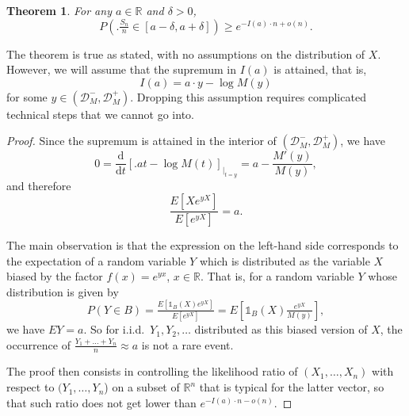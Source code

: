 \documentclass[12pt]{article}
\newtheorem{theorem}[equation]{Theorem}
\theoremstyle{definition}
\newcommand{\dd}{\mathrm{d}}
\newcommand{\D}{\mathcal{D}}
\newcommand{\E}{\mathbb{E}}
\newcommand{\I}{\mathds{1}}
\renewcommand{\P}{\mathbb{P}}
\newcommand{\R}{\mathbb{R}}
\renewcommand{\ge}{\geqslant}
\renewcommand{\t}{t}
\newcommand{\y}{y}
\renewcommand{\E}{E}
\renewcommand{\P}{P}
\begin{document}
\begin{theorem}
\label{thm:lowercramer}
For any $a\in\R$ and $\delta>0$,
\[
\displaystyle
\P\left( \big. \tfrac{S_n}{n} \in [a-\delta,a+\delta] \right)
\ge
e^{-I(a)\cdot n + o(n)}
.
\]
\end{theorem}
The theorem is true as stated, with no assumptions on the distribution of $X$.
However, we will assume that the supremum in $I(a)$ is attained, that is,
\[
I(a) = a \cdot \y - \log M(\y)
\]
for some $\y \in ( \D_M^- , \D_M^+)$.
Dropping this assumption requires complicated technical steps that we cannot go into.
\begin{proof}
Since the supremum is attained in the interior of $(\D_M^-,\D_M^+)$, we have
\[
0
=
\frac{\dd}{\dd \t}\left[ \Big. a\t -\log M(\t) \right]_{\big|_{\t=\y}}
=
a - \frac{M'(\y)}{M(\y)}
,
\]
and therefore
\[
\frac{\E[Xe^{\y X}]}{\E[e^{\y X}]} = a
.
\]

The main observation is that the expression on the left-hand side corresponds to the expectation of a random variable $Y$ which is distributed as the variable $X$ biased by the factor $f(x)=e^{\y x}$, $x\in\R$.
That is, for a random variable $Y$ whose distribution is given by
\[
\P(Y \in B) =
\tfrac{\E[ \I_{B}(X) e^{\y X}]}{\E[e^{\y X}]} =
\E\left[ \I_{B}(X) \tfrac{ e^{\y X} }{M(\y)}\right]
,
\]
we have $\E Y=a$.
So for i.i.d.\ $Y_1,Y_2,\dots$ distributed as this biased version of $X$, the occurrence of $\frac{Y_1+\dots+Y_n}{n} \approx a$ is not a rare event.

The proof then consists in controlling the likelihood ratio of $(X_1,\dots,X_n)$ with respect to $(Y_1,\dots,Y_n$) on a subset of $\R^n$ that is typical for the latter vector, so that such ratio does not get lower than $e^{-I(a)\cdot n - o(n)}$.


\end{proof}
\end{document}
